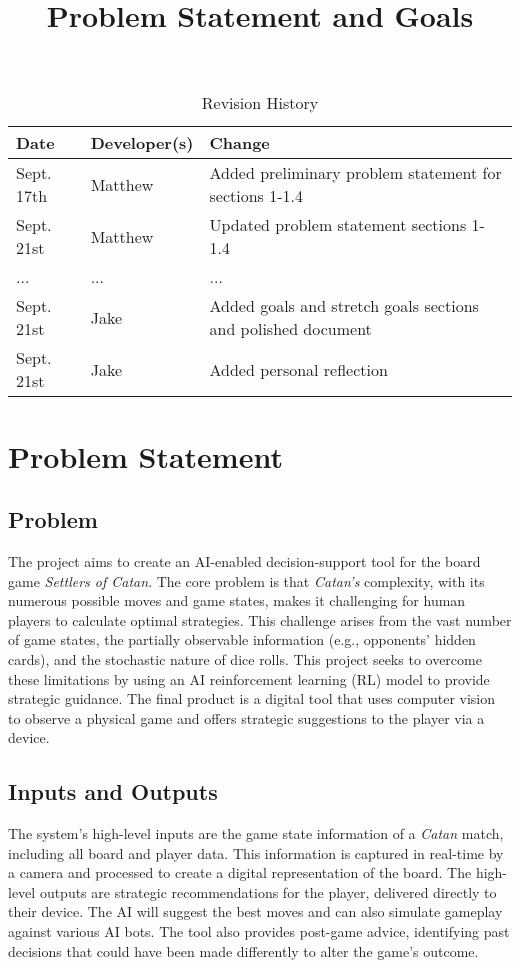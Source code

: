 \documentclass{article}
\title{Problem Statement and Goals\\\progname}
\author{\authname}
\date{}
\begin{document}
\maketitle

\begin{table}[hp]
\caption{Revision History} \label{TblRevisionHistory}
\begin{tabularx}{\textwidth}{llX}
\toprule
\textbf{Date} & \textbf{Developer(s)} & \textbf{Change}\\
\midrule
Sept. 17th & Matthew & Added preliminary problem statement for sections 1-1.4\\
Sept. 21st & Matthew & Updated problem statement sections 1-1.4\\
... & ... & ...\\
Sept. 21st & Jake & Added goals and stretch goals sections and polished document\\
Sept. 21st & Jake & Added personal reflection\\
\bottomrule
\end{tabularx}
\end{table}

\section{Problem Statement}\label{sec:problem-statement}

\subsection{Problem}
The project aims to create an AI-enabled decision-support tool for the board game \emph{Settlers of Catan}. The core problem is that \emph{Catan's} complexity, with its numerous possible moves and game states, makes it challenging for human players to calculate optimal strategies. This challenge arises from the vast number of game states, the partially observable information (e.g., opponents' hidden cards), and the stochastic nature of dice rolls. This project seeks to overcome these limitations by using an AI reinforcement learning (RL) model to provide strategic guidance. The final product is a digital tool that uses computer vision to observe a physical game and offers strategic suggestions to the player via a device.

\subsection{Inputs and Outputs}
The system's high-level inputs are the game state information of a \emph{Catan} match, including all board and player data. This information is captured in real-time by a camera and processed to create a digital representation of the board. The high-level outputs are strategic recommendations for the player, delivered directly to their device. The AI will suggest the best moves and can also simulate gameplay against various AI bots. The tool also provides post-game advice, identifying past decisions that could have been made differently to alter the game's outcome.
\end{document}
